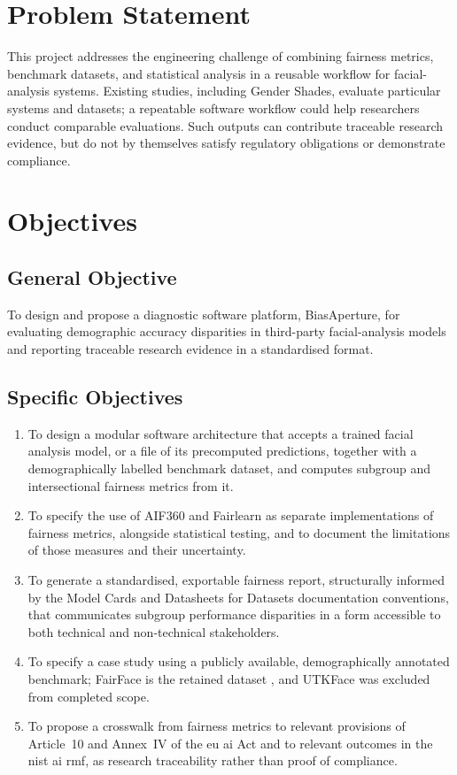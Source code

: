 \section{Problem Statement}

This project addresses the engineering challenge of combining fairness metrics, benchmark datasets, and statistical analysis in a reusable workflow for facial-analysis systems. Existing studies, including Gender Shades, evaluate particular systems and datasets; a repeatable software workflow could help researchers conduct comparable evaluations. Such outputs can contribute traceable research evidence, but do not by themselves satisfy regulatory obligations or demonstrate compliance.

\section{Objectives}

\subsection{General Objective}
To design and propose a diagnostic software platform, BiasAperture, for evaluating demographic accuracy disparities in third-party facial-analysis models and reporting traceable research evidence in a standardised format.

\subsection{Specific Objectives}
\begin{enumerate}
    \item To design a modular software architecture that accepts a trained facial analysis model, or a file of its precomputed predictions, together with a demographically labelled benchmark dataset, and computes subgroup and intersectional fairness metrics from it.
    \item To specify the use of AIF360 and Fairlearn as separate implementations of fairness metrics, alongside statistical testing, and to document the limitations of those measures and their uncertainty.
    \item To generate a standardised, exportable fairness report, structurally informed by the Model Cards \cite{mitchell2019modelcards} and Datasheets for Datasets \cite{gebru2018datasheets} documentation conventions, that communicates subgroup performance disparities in a form accessible to both technical and non-technical stakeholders.
    \item To specify a case study using a publicly available, demographically annotated benchmark; FairFace is the retained dataset \cite{karkkainen2021fairface}, and UTKFace was excluded from completed scope.
    \item To propose a crosswalk from fairness metrics to relevant provisions of Article~10 and Annex~IV of the \gls{eu} \gls{ai} Act and to relevant outcomes in the \gls{nist} \gls{ai} \gls{rmf}, as research traceability rather than proof of compliance.
\end{enumerate}

